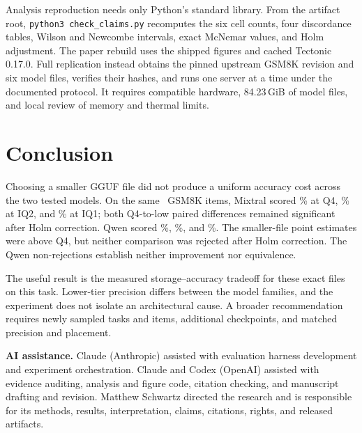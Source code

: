 \documentclass[11pt]{article}
\providecommand{\PfourBibliographyPath}{references}
\newcommand{\q}[1]{\texttt{#1}}
\begin{document}
Analysis reproduction needs only Python's standard library. From the artifact
root, \q{python3 check\_claims.py} recomputes the six cell counts, four
discordance tables, Wilson and Newcombe intervals, exact McNemar values, and
Holm adjustment. The paper rebuild uses the shipped figures and cached
Tectonic 0.17.0. Full replication instead obtains the pinned upstream GSM8K
revision and six model files, verifies their hashes, and runs one server at a
time under the documented protocol. It requires compatible hardware,
84.23\,GiB of model files, and local review of memory and thermal limits.

\section{Conclusion}
\enlargethispage{\baselineskip}

Choosing a smaller GGUF file did not produce a uniform accuracy cost across
the two tested models. On the same \PfourPrimaryItemCount\ GSM8K items,
Mixtral scored \PfourMixtralHealthyAccuracyPct\% at Q4,
\PfourMixtralIqTwoAccuracyPct\% at IQ2, and
\PfourMixtralIqOneAccuracyPct\% at IQ1; both Q4-to-low paired differences
remained significant after Holm correction. Qwen scored
\PfourQwenMoeHealthyAccuracyPct\%, \PfourQwenMoeIqTwoAccuracyPct\%, and
\PfourQwenMoeIqOneAccuracyPct\%. The smaller-file point estimates were above
Q4, but neither comparison was rejected after Holm correction.
The Qwen non-rejections establish neither improvement nor equivalence.

The useful result is the measured storage--accuracy tradeoff for these exact
files on this task. Lower-tier precision differs between the model families,
and the experiment does not isolate an architectural cause. A broader
recommendation requires newly sampled tasks and items, additional
checkpoints, and matched precision and placement.

\medskip
\noindent\textbf{AI assistance.} Claude (Anthropic) assisted with evaluation
harness development and experiment orchestration. Claude and Codex (OpenAI)
assisted with evidence auditing, analysis and figure code, citation checking,
and manuscript drafting and revision. Matthew Schwartz directed the research
and is responsible for its methods, results, interpretation, claims,
citations, rights, and released artifacts.



\end{document}
